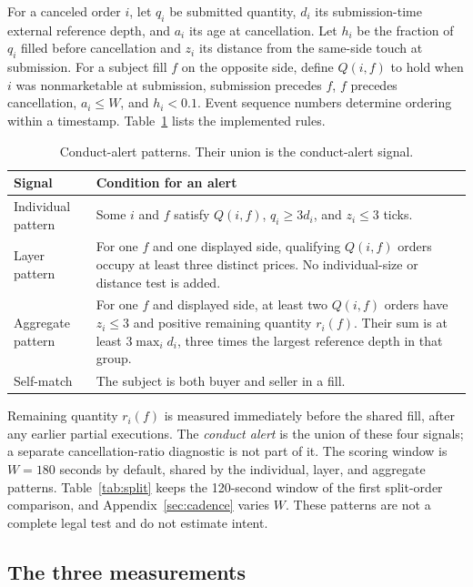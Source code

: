 \documentclass{article}
\begin{document}
For a canceled order $i$, let $q_i$ be submitted quantity, $d_i$ its submission-time external reference depth, and $a_i$ its age at cancellation. Let $h_i$ be the fraction of $q_i$ filled before cancellation and $z_i$ its distance from the same-side touch at submission. For a subject fill $f$ on the opposite side, define $Q(i,f)$ to hold when $i$ was nonmarketable at submission, submission precedes $f$, $f$ precedes cancellation, $a_i \leq W$, and $h_i < 0.1$. Event sequence numbers determine ordering within a timestamp. Table~\ref{tab:patterns} lists the implemented rules.

\begin{table}[htbp]
\centering
\small
\begin{tabularx}{\linewidth}{lX}
\toprule
\textbf{Signal} & \textbf{Condition for an alert} \\
\midrule
Individual pattern & Some $i$ and $f$ satisfy $Q(i,f)$, $q_i \geq 3d_i$, and $z_i \leq 3$ ticks. \\
Layer pattern & For one $f$ and one displayed side, qualifying $Q(i,f)$ orders occupy at least three distinct prices. No individual-size or distance test is added. \\
Aggregate pattern & For one $f$ and displayed side, at least two $Q(i,f)$ orders have $z_i \leq 3$ and positive remaining quantity $r_i(f)$. Their sum is at least $3\max_i d_i$, three times the largest reference depth in that group. \\
Self-match & The subject is both buyer and seller in a fill. \\
\bottomrule
\end{tabularx}
\caption{Conduct-alert patterns. Their union is the conduct-alert signal.}
\label{tab:patterns}
\end{table}

Remaining quantity $r_i(f)$ is measured immediately before the shared fill, after any earlier partial executions. The \emph{conduct alert} is the union of these four signals; a separate cancellation-ratio diagnostic is not part of it. The scoring window is $W = 180$ seconds by default, shared by the individual, layer, and aggregate patterns. Table~\ref{tab:split} keeps the 120-second window of the first split-order comparison, and Appendix~\ref{sec:cadence} varies $W$. These patterns are not a complete legal test and do not estimate intent.

\subsection{The three measurements}\label{sec:design}
\end{document}
